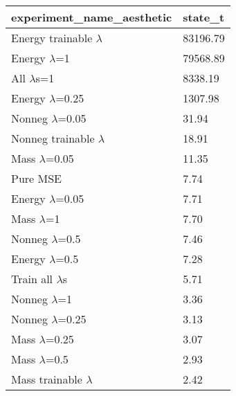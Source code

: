 \begin{tabular}{ll}
\toprule
experiment_name_aesthetic & state_t \\
\midrule
Energy trainable $\lambda$ & 83196.79 \\
Energy $\lambda$=1 & 79568.89 \\
All $\lambda$s=1 & 8338.19 \\
Energy $\lambda$=0.25 & 1307.98 \\
Nonneg $\lambda$=0.05 & 31.94 \\
Nonneg trainable $\lambda$ & 18.91 \\
Mass $\lambda$=0.05 & 11.35 \\
Pure MSE & 7.74 \\
Energy $\lambda$=0.05 & 7.71 \\
Mass $\lambda$=1 & 7.70 \\
Nonneg $\lambda$=0.5 & 7.46 \\
Energy $\lambda$=0.5 & 7.28 \\
Train all $\lambda$s & 5.71 \\
Nonneg $\lambda$=1 & 3.36 \\
Nonneg $\lambda$=0.25 & 3.13 \\
Mass $\lambda$=0.25 & 3.07 \\
Mass $\lambda$=0.5 & 2.93 \\
Mass trainable $\lambda$ & 2.42 \\
\bottomrule
\end{tabular}
